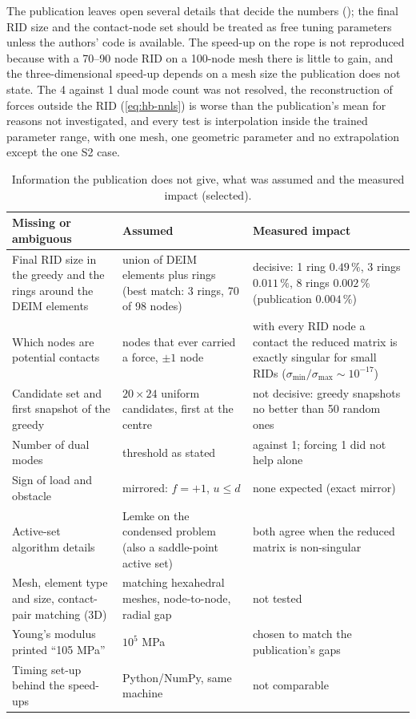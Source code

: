 The publication leaves open several details that decide the numbers (); the final RID size and the contact-node set should be treated as free tuning parameters unless the authors' code is available. The speed-up on the rope is not reproduced because with a 70--90 node RID on a 100-node mesh there is little to gain, and the three-dimensional speed-up depends on a mesh size the publication does not state. The 4 against 1 dual mode count was not resolved, the reconstruction of forces outside the RID (\cref{eq:hb-nnls}) is worse than the publication's mean for reasons not investigated, and every test is interpolation inside the trained parameter range, with one mesh, one geometric parameter and no extrapolation except the one S2 case.

\begin{table}[tbp]
\centering\footnotesize
\caption{Information the publication does not give, what was assumed and the measured impact (selected).}\label{tab:vf-hb-gaps}
\begin{tabularx}{\linewidth}{@{}>{\raggedright\arraybackslash}p{4.2cm} >{\raggedright\arraybackslash}X >{\raggedright\arraybackslash}X@{}}
\toprule
Missing or ambiguous & Assumed & Measured impact\\
\midrule
Final RID size in the greedy and the rings around the DEIM elements & union of DEIM elements plus rings (best match: 3 rings, 70 of 98 nodes) & decisive: 1 ring $0.49\,\%$, 3 rings $0.011\,\%$, 8 rings $0.002\,\%$ (publication $0.004\,\%$)\\
Which nodes are potential contacts & nodes that ever carried a force, $\pm1$ node & with every RID node a contact the reduced matrix is exactly singular for small RIDs ($\sigma_{\min}/\sigma_{\max}\sim10^{-17}$)\\
Candidate set and first snapshot of the greedy & $20\times24$ uniform candidates, first at the centre & not decisive: greedy snapshots no better than 50 random ones\\
Number of dual modes & threshold as stated & 4 against 1; forcing 1 did not help alone\\
Sign of load and obstacle & mirrored: $f=+1$, $u\le d$ & none expected (exact mirror)\\
Active-set algorithm details & Lemke on the condensed problem (also a saddle-point active set) & both agree when the reduced matrix is non-singular\\
Mesh, element type and size, contact-pair matching (3D) & matching hexahedral meshes, node-to-node, radial gap & not tested\\
Young's modulus printed ``105 MPa'' & $10^5$ MPa & chosen to match the publication's gaps\\
Timing set-up behind the speed-ups & Python/NumPy, same machine & not comparable\\
\bottomrule
\end{tabularx}
\end{table}
